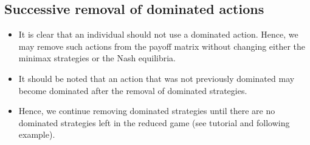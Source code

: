 \documentclass[]{report}
\begin{document}
	\subsection{Successive removal of dominated actions}
	\begin{itemize}
		\item It is clear that an individual should not use a dominated action.
		Hence, we may remove such actions from the payoff matrix without
		changing either the minimax strategies or the Nash equilibria.
		\item	It should be noted that an action that was not previously
		dominated may become dominated after the removal of dominated
		strategies.
		\item Hence, we continue removing dominated strategies until there are
		no dominated strategies left in the reduced game (see tutorial and
		following example).
	\end{itemize}
	
\end{document}
